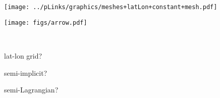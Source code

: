 \begin{slide}

\begin{minipage}{0.6\linewidth}
\texttt{[image: ../pLinks/graphics/meshes+latLon+constant+mesh.pdf]}

\vspace{-0.55\linewidth} \hspace{2.1in}
\texttt{[image: figs/arrow.pdf]}

\vspace{0.5\linewidth}\ \\
\end{minipage}
\hfill
\begin{minipage}{0.35\linewidth}

\begin{list0}
\item lat-lon grid?
\item semi-implicit?
\item semi-Lagrangian?
\end{list0}

\end{minipage}

\end{slide}


